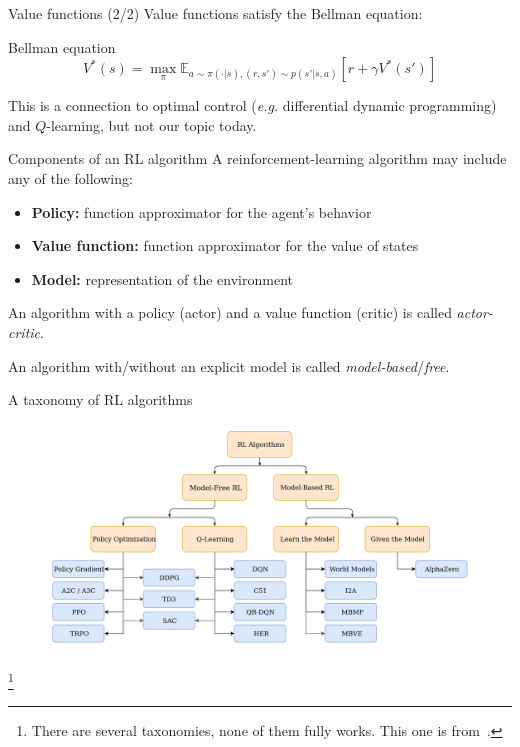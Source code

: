 \documentclass[10pt, aspectratio=1610]{beamer}
\newcommand\blfootnote[1]{%
  \begingroup
  \renewcommand\thefootnote{}%
  \footnote{#1}%
  \addtocounter{footnote}{-1}%
  \endgroup
}
\begin{document}
\begin{frame}{Value functions (2/2)}
    Value functions satisfy the Bellman equation:
    \begin{block}{Bellman equation}
        \[
            V^*(s) = \max_\pi \mathbb{E}_{a \sim \pi(\cdot | s), (r, s') \sim p(s' | s, a)}[r + \gamma V^*(s')]
        \]
    \end{block}
    This is a connection to optimal control (\emph{e.g.} differential dynamic programming) and $Q$-learning, but not our topic today.
\end{frame}

\begin{frame}{Components of an RL algorithm}
    A reinforcement-learning algorithm may include any of the following:
    \begin{itemize}
        \item \textbf{Policy:} function approximator for the agent's behavior
        \item \textbf{Value function:} function approximator for the value of states
        \item \textbf{Model:} representation of the environment
    \end{itemize}
    An algorithm with a policy (actor) and a value function (critic) is called \emph{actor-critic}.

    An algorithm with/without an explicit model is called \emph{model-based}/\emph{free}.
\end{frame}

\begin{frame}{A taxonomy of RL algorithms}
    \begin{figure}
        \includegraphics[height=6cm]{figures/taxonomy.png}
    \end{figure}
    \blfootnote{
        There are several taxonomies, none of them fully works. This one is from~\cite{spinningup}.
    }
\end{frame}
\end{document}

